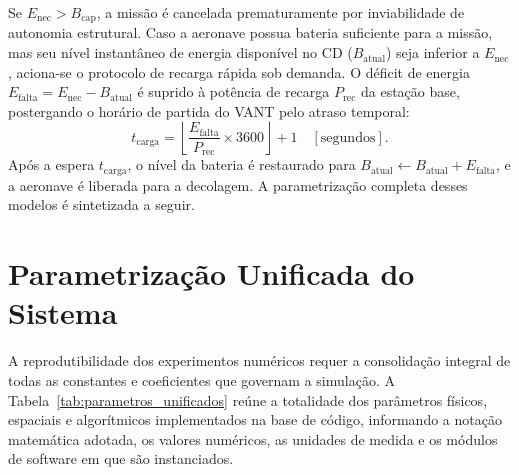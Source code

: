 Se $E_{\text{nec}} > B_{\text{cap}}$, a missão é cancelada prematuramente por inviabilidade de autonomia estrutural. Caso a aeronave possua bateria suficiente para a missão, mas seu nível instantâneo de energia disponível no CD ($B_{\text{atual}}$) seja inferior a $E_{\text{nec}}$, aciona-se o protocolo de recarga rápida sob demanda. O déficit de energia $E_{\text{falta}} = E_{\text{nec}} - B_{\text{atual}}$ é suprido à potência de recarga $P_{\text{rec}}$ da estação base, postergando o horário de partida do VANT pelo atraso temporal:
\begin{equation}\label{eq:tempo_recarga}
t_{\text{carga}} = \left\lfloor \frac{E_{\text{falta}}}{P_{\text{rec}}} \times 3600 \right\rfloor + 1 \quad [\text{segundos}].
\end{equation}
Após a espera $t_{\text{carga}}$, o nível da bateria é restaurado para $B_{\text{atual}} \leftarrow B_{\text{atual}} + E_{\text{falta}}$, e a aeronave é liberada para a decolagem. A parametrização completa desses modelos é sintetizada a seguir.

\section{Parametrização Unificada do Sistema}\label{sec:parametrizacao_sistema}

A reprodutibilidade dos experimentos numéricos requer a consolidação integral de todas as constantes e coeficientes que governam a simulação. A Tabela~\ref{tab:parametros_unificados} reúne a totalidade dos parâmetros físicos, espaciais e algorítmicos implementados na base de código, informando a notação matemática adotada, os valores numéricos, as unidades de medida e os módulos de software em que são instanciados.

